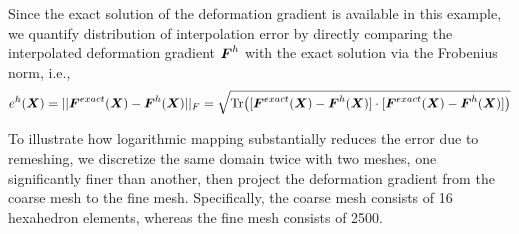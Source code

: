 \documentclass[12pt]{article}
\begin{document}
Since the exact solution of the deformation gradient is available in
this example, we quantify distribution of interpolation error by
directly comparing the interpolated deformation gradient ${\boldsymbol{F}}^{h}$
with the exact solution via the Frobenius norm, i.e.,
\begin{equation}
 e^{h}({\boldsymbol{X}}) = || {\boldsymbol{F}}^{exact} ({\boldsymbol{X}})- {\boldsymbol{F}}^{h}({\boldsymbol{X}}) ||_{F} 
 = \sqrt{\text{Tr}\big( [{\boldsymbol{F}}^{exact} ({\boldsymbol{X}})- {\boldsymbol{F}}^{h}({\boldsymbol{X}})] 
     \cdot [{\boldsymbol{F}}^{exact} ({\boldsymbol{X}})- {\boldsymbol{F}}^{h}({\boldsymbol{X}})] \big) }
 \label{eq:FrobeniusNormDistribution}
\end{equation} 

To illustrate how logarithmic mapping substantially reduces the error
due to remeshing, we discretize the same domain twice with two meshes,
one significantly finer than another, then project the deformation
gradient from the coarse mesh to the fine mesh.  Specifically, the
coarse mesh consists of 16 hexahedron elements, whereas the fine mesh
consists of 2500.
 
\end{document}
